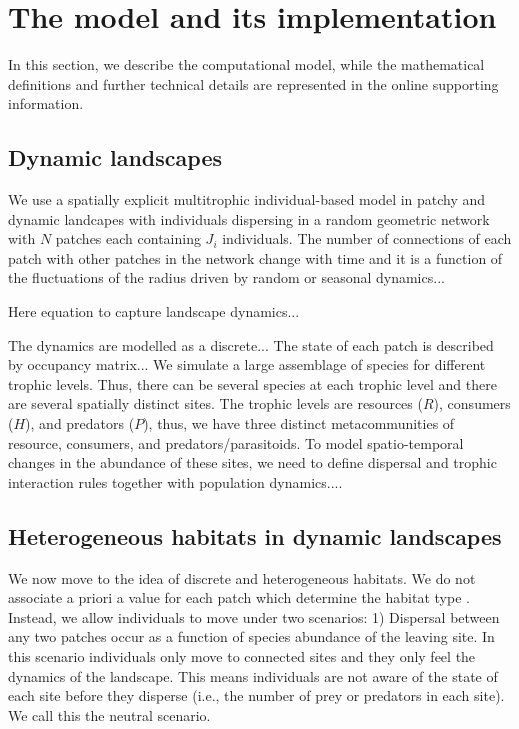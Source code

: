\section{The model and its implementation}

In this section, we describe the computational model, while the
mathematical definitions and further technical details are represented
in the online supporting information.

\subsection{Dynamic landscapes}

We use a spatially explicit multitrophic individual-based model in
patchy and dynamic landcapes with individuals dispersing in a random
geometric network with $N$ patches each containing $J_{i}$
individuals. The number of connections of each patch with other
patches in the network change with time and it is a function of the
fluctuations of the radius driven by random or seasonal dynamics...

\vspace{0.2 in}
Here equation to capture landscape dynamics...
\vspace{0.2 in}

The dynamics are modelled as a discrete...  The state of each patch is
described by occupancy matrix... We simulate a large assemblage of
species for different trophic levels. Thus, there can be several
species at each trophic level and there are several spatially distinct
sites. The trophic levels are resources ($R$), consumers ($H$), and
predators ($P$), thus, we have three distinct metacommunities of
resource, consumers, and predators/parasitoids. To model
spatio-temporal changes in the abundance of these sites, we need to
define dispersal and trophic interaction rules together with
population dynamics....

\subsection{Heterogeneous habitats in dynamic landscapes}

We now move to the idea of discrete and heterogeneous habitats. We do
not associate a priori a value for each patch which determine the
habitat type \cite{rybickihanski2013}. Instead, we allow individuals
to move under two scenarios: 1) Dispersal between any two patches
occur as a function of species abundance of the leaving site. In this
scenario individuals only move to connected sites and they only feel
the dynamics of the landscape. This means individuals are not aware of
the state of each site before they disperse (i.e., the number of prey
or predators in each site). We call this the neutral scenario.

